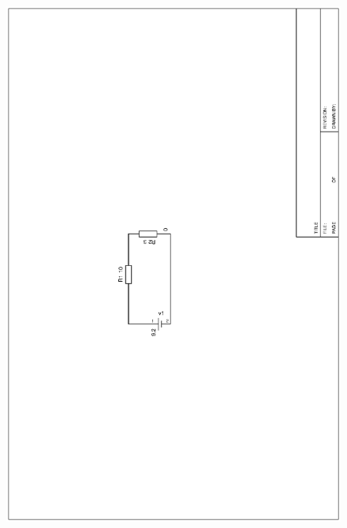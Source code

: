 \documentclass{report}
\begin{document}
\begin{figure}[b!]
\centering
{} {\includegraphics[width=\columnwidth]{01.ps}}
\label{att:4}
\end{figure}
\end{document}
